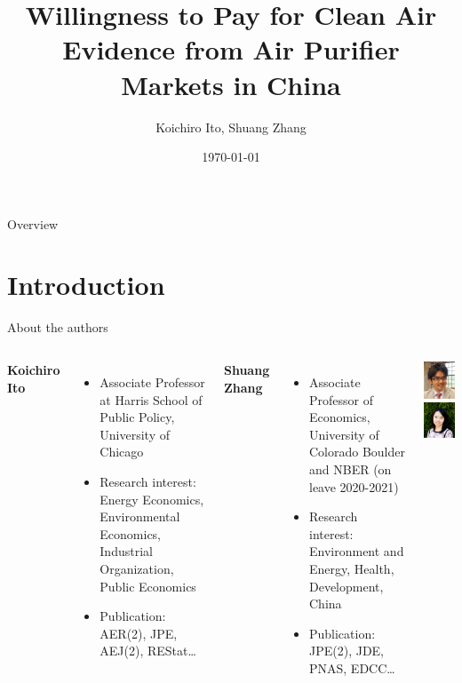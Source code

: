 \documentclass{beamer}
\title[JPE, 2020]{Willingness to Pay for Clean Air \\ {\small Evidence from Air Purifier Markets in China}}
\author{Koichiro Ito, Shuang Zhang}
\institute[]{Presenter: Qinzhu Sun}
\date{\today} %
\begin{document}
\begin{frame}
\titlepage
\end{frame}

\begin{frame}{Overview}
\tableofcontents
\end{frame}

\section{Introduction}
\begin{frame}[shrink]
	\transfade %
	\tableofcontents[sectionstyle=show/shaded,subsectionstyle=show/shaded/hide]
	\addtocounter{framenumber}{-1}
\end{frame}
\begin{frame}{About the authors}
	\begin{columns}
		\textbf{Koichiro Ito} 
		\begin{itemize}
			\item Associate Professor at Harris School of Public Policy, University of Chicago
			\item Research interest: Energy Economics, Environmental Economics, Industrial Organization, Public Economics
			\item Publication: AER(2), JPE, AEJ(2), REStat\dots
		\end{itemize}
		\textbf{Shuang Zhang} 
		\begin{itemize}
			\item Associate Professor of Economics, University of Colorado Boulder and NBER (on leave 2020-2021)
			\item Research interest: Environment and Energy, Health, Development, China
			\item Publication: JPE(2), JDE, PNAS, EDCC\dots
		\end{itemize}
		\includegraphics[width=2.5cm]{ito.jpg}
		\includegraphics[width=2.5cm]{zhang.jpg}
	\end{columns}
\end{frame}
\end{document}
